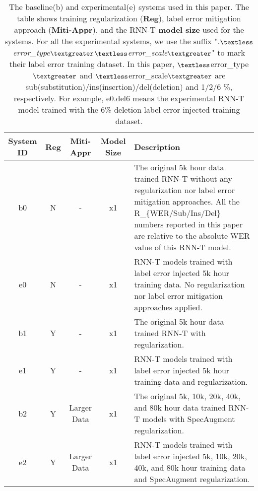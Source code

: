 \documentclass{article}
\begin{document}
\begin{table*}[t]
\caption{The baseline(b) and experimental(e) systems used in this paper. The table shows training regularization (\textbf{Reg}), label error mitigation approach (\textbf{Miti-Appr}), and the RNN-T \textbf{model size} used for the systems. For all the experimental systems, we use the suffix "\textit{.$\textless$error\_type$\textgreater$$\textless$error\_scale$\textgreater$}" to mark their label error training dataset. In this paper, $\textless$error\_type$\textgreater$ and $\textless$error\_scale$\textgreater$ are sub(substitution)/ins(insertion)/del(deletion) and 1/2/6 \%, respectively. For example, e0.del6 means the experimental RNN-T model trained with the 6\% deletion label error injected training dataset.}
\label{tab:exp_summary}
\begin{tabular}{|c|c|c|c|p{10cm}|}
\hline
\rowcolor[HTML]{EFEFEF} 
{\color[HTML]{333333} 
\textbf{System ID}}      & \textbf{Reg} & \textbf{Miti-Appr}       & \textbf{Model Size} & \textbf{Description}    \\ \hline
  b0                     & N            & \multicolumn{1}{c|}{-}   & x1                  & The original 5k hour data trained RNN-T without any regularization nor label error mitigation approaches. All the R\_\{WER/Sub/Ins/Del\} numbers reported in this paper are relative to the absolute WER value of this RNN-T model. \\ \hline
  e0                     & N            & \multicolumn{1}{c|}{-}   & x1                  & RNN-T models trained with label error injected 5k hour training data. No regularization nor label error mitigation approaches applied. \\ \hline
  b1                     & Y            & \multicolumn{1}{c|}{-}   & x1                  & The original 5k hour data trained RNN-T with regularization.   \\ \hline
  e1                     & Y            & \multicolumn{1}{c|}{-}   & x1                  & RNN-T models trained with label error injected 5k hour training data and regularization.                                                          \\ \hline
  b2                     & Y            & Larger Data              & x1                  & The original 5k, 10k, 20k, 40k, and 80k hour data trained RNN-T models with SpecAugment regularization. \\ \hline
  e2                     & Y            & Larger Data              & x1                  & RNN-T models trained with label error injected 5k, 10k, 20k, 40k, and 80k hour training data and SpecAugment regularization.  \\ \hline

\end{tabular}
\end{table*}
\end{document}

